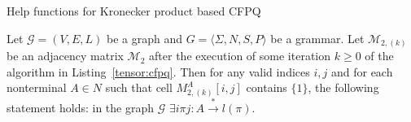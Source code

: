 \begin{algorithm}[h]
\begin{algorithmic}[1]
\footnotesize
\caption{Help functions for Kronecker product based CFPQ}
\label{tensor:cfpq:help}
    \State {}
\EndFunction
{}
    \State {}
\EndFunction
\end{algorithmic}
\end{algorithm}

\begin{lemma}
    \label{lemma:algo:correctness}
    Let $\mathcal{G} = (V,E,L)$ be a graph and $G = \langle\Sigma, N, S, P\rangle$ be a grammar.
    Let $\mathcal{M}_{2,(k)}$ be an adjacency matrix $\mathcal{M}_2$ after the execution of some iteration $k \geq 0$ of the algorithm in Listing~\ref{tensor:cfpq}.
    Then for any valid indices $i, j$ and for each nonterminal $A \in N$ such that cell $M_{2,(k)}^A[i,j]$ contains $\{1\}$, the following statement holds: in the graph $\mathcal{G}$ $\exists i\pi j: A \xrightarrow{*} l(\pi)$.
\end{lemma}

